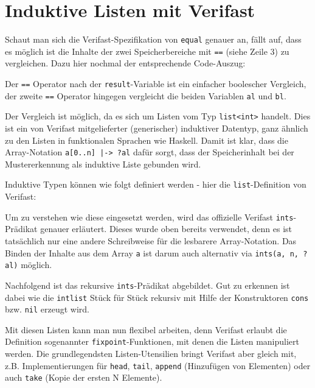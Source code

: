 ﻿\section{Induktive Listen mit Verifast}
\label{sec:induktive-listen}

Schaut man sich die Verifast-Spezifikation von \lstinline{equal} genauer an, fällt auf, dass es 
möglich ist die Inhalte der zwei Speicherbereiche mit \lstinline{==} (siehe Zeile 3) zu vergleichen. 
Dazu hier nochmal der entsprechende Code-Auszug:



Der \lstinline{==} Operator nach der \lstinline{result}-Variable ist ein einfacher boolescher Vergleich,
der zweite \lstinline{==} Operator hingegen vergleicht die beiden Variablen \lstinline{al} und \lstinline{bl}.

Der Vergleich ist möglich, da es sich um Listen vom Typ \lstinline{list<int>} handelt. Dies ist ein
von Verifast mitgelieferter (generischer) induktiver Datentyp, ganz ähnlich zu den Listen in funktionalen 
Sprachen wie Haskell. Damit ist klar, dass die Array-Notation \lstinline{a[0..n] |-> ?al} dafür sorgt, 
dass der Speicherinhalt bei der Mustererkennung als induktive Liste gebunden wird.

Induktive Typen können wie folgt definiert werden - hier die \lstinline{list}-Definition von Verifast:



Um zu verstehen wie diese eingesetzt werden, wird das offizielle Verifast \lstinline{ints}-Prädikat genauer
erläutert. Dieses wurde oben bereits verwendet, denn es ist tatsächlich nur eine andere Schreibweise für die 
lesbarere Array-Notation. Das Binden der Inhalte aus dem Array \lstinline{a} ist darum auch alternativ via 
\lstinline{ints(a, n, ?al)} möglich.

Nachfolgend ist das rekursive \lstinline{ints}-Prädikat abgebildet. Gut zu erkennen ist dabei
wie die \lstinline{intlist} Stück für Stück rekursiv mit Hilfe der Konstruktoren
\lstinline{cons} bzw. \lstinline{nil} erzeugt wird.



Mit diesen Listen kann man nun flexibel arbeiten, denn Verifast erlaubt die Definition sogenannter
\lstinline{fixpoint}-Funktionen, mit denen die Listen manipuliert werden. Die grundlegendsten
Listen-Utensilien bringt Verifast aber gleich mit, z.B. Implementierungen für \lstinline{head}, 
\lstinline{tail}, \lstinline{append} (Hinzufügen von Elementen) oder auch \lstinline{take} 
(Kopie der ersten N Elemente).



